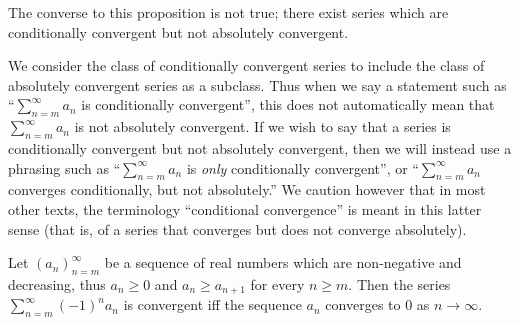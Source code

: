 \begin{rmk}\label{i:7.2.10}
  The converse to this proposition is not true;
  there exist series which are conditionally convergent but not absolutely convergent.
\end{rmk}

\begin{rmk}\label{i:7.2.11}
  We consider the class of conditionally convergent series to include the class of absolutely convergent series as a subclass.
  Thus when we say a statement such as ``\(\sum_{n = m}^\infty a_n\) is conditionally convergent'', this does not automatically mean that \(\sum_{n = m}^\infty a_n\) is not absolutely convergent.
  If we wish to say that a series is conditionally convergent but not absolutely convergent, then we will instead use a phrasing such as ``\(\sum_{n = m}^\infty a_n\) is \emph{only} conditionally convergent'', or ``\(\sum_{n = m}^\infty a_n\) converges conditionally, but not absolutely.''
  We caution however that in most other texts, the terminology ``conditional convergence'' is meant in this latter sense
  (that is, of a series that converges but does not converge absolutely).
\end{rmk}

\begin{prop}\label{i:7.2.12}
  Let \((a_n)_{n = m}^\infty\) be a sequence of real numbers which are non-negative and decreasing, thus \(a_n \geq 0\) and \(a_n \geq a_{n + 1}\) for every \(n \geq m\).
  Then the series \(\sum_{n = m}^\infty (-1)^n a_n\) is convergent iff the sequence \(a_n\) converges to \(0\) as \(n \to \infty\).
\end{prop}

